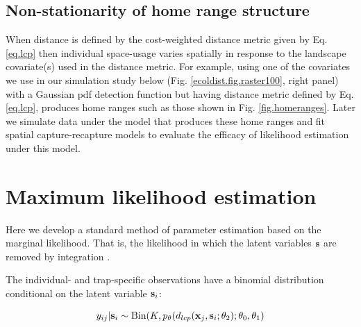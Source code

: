 \documentclass[12pt]{article}
\begin{document}
\begin{spacing}{1.8}

\subsection{Non-stationarity of home range structure}

When distance is defined by the cost-weighted distance metric given
by Eq. \ref{eq.lcp} then individual space-usage varies
spatially in response to the landscape covariate(s) used in the
distance metric. For example, using one of the covariates we use in
our simulation study below (Fig. \ref{ecoldist.fig.raster100}, right
panel) with a Gaussian pdf detection function but having distance
metric defined by Eq. \ref{eq.lcp}, produces home ranges such
as those shown in Fig. \ref{fig.homeranges}. Later we simulate data
under the model that produces these home ranges and fit spatial
capture-recapture models to evaluate the efficacy of likelihood
estimation under this model. 




\section{Maximum likelihood estimation}
\label{sec.mle}

Here we develop a standard method of parameter estimation based on
the marginal likelihood. That is, the likelihood in which the latent
variables ${\bf s}$ are removed by integration \citep{borchers_efford:2008}.

The individual- and trap-specific observations have a binomial
distribution conditional on the latent variable ${\bf s}_{i}$:

\begin{equation}
	y_{ij}| {\bf s}_{i} \sim \mbox{Bin}(K, p_{\theta}(d_{lcp}({\bf x}_{j},{\bf s}_{i};\theta_{2}); \theta_{0}, \theta_{1})
\label{mle.eq.cond-on-s}
\end{equation}


\end{spacing}
\end{document}
